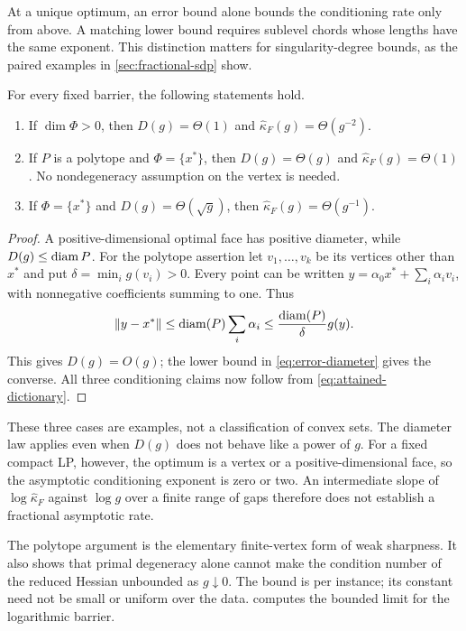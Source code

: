 At a unique optimum, an error bound alone bounds the conditioning rate
only from above. A matching lower bound requires sublevel chords
whose lengths have the same exponent. This distinction matters for
singularity-degree bounds, as the paired examples in
\cref{sec:fractional-sdp} show.

\begin{proposition}
\label{prop:three-regimes}
For every fixed barrier, the following statements hold.
\begin{enumerate}
 \item If $\dim\Phi>0$, then
 $D(g)=\Theta(1)$ and $\widehat\kappa_F(g)=\Theta(g^{-2})$.
 \item If $P$ is a polytope and $\Phi=\{x^*\}$, then
 $D(g)=\Theta(g)$ and $\widehat\kappa_F(g)=\Theta(1)$.
 No nondegeneracy assumption on the vertex is needed.
 \item If $\Phi=\{x^*\}$ and $D(g)=\Theta(\sqrt g)$, then
 $\widehat\kappa_F(g)=\Theta(g^{-1})$.
\end{enumerate}
\end{proposition}

\begin{proof}
A positive-dimensional optimal face has positive diameter, while
$D(g)\leq\operatorname{diam} P$. For the polytope assertion let $v_1,\ldots,v_k$
be its vertices other than $x^*$ and put
$\delta=\min_i g(v_i)>0$. Every point can be written
$y=\alpha_0x^*+\sum_i\alpha_iv_i$, with nonnegative coefficients
summing to one. Thus
\[
 \left\lVert y-x^*\right\rVert\leq\operatorname{diam}(P)\sum_i\alpha_i
 \leq\frac{\operatorname{diam}(P)}{\delta}g(y).
\]
This gives $D(g)=O(g)$; the lower bound in
\eqref{eq:error-diameter} gives the converse. All three conditioning
claims now follow from \eqref{eq:attained-dictionary}.
\end{proof}

These three cases are examples, not a classification of convex sets.
The diameter law applies even when $D(g)$ does not behave like a power
of $g$. For a fixed compact LP, however, the optimum is a vertex or a
positive-dimensional face, so the asymptotic conditioning exponent is
zero or two. An intermediate slope of $\log\widehat\kappa_F$ against
$\log g$ over a finite range of gaps therefore does not establish a
fractional asymptotic rate.

The polytope argument is the elementary finite-vertex form of weak
sharpness. It also shows that primal degeneracy alone cannot make the
condition number of the reduced Hessian unbounded as
$g\downarrow0$. The bound is per instance; its constant need not
be small or uniform over the data.
 computes the bounded limit for the logarithmic
barrier.

